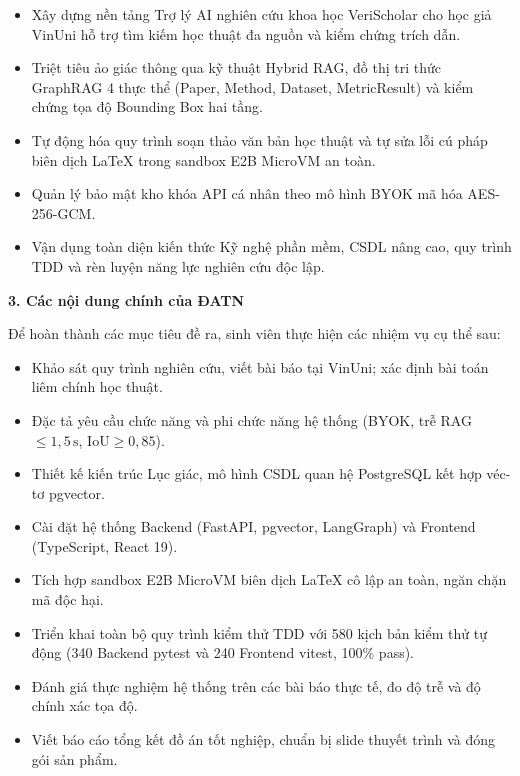 \begin{itemize}[leftmargin=*, itemsep=1.5pt, topsep=2pt, parsep=0pt, partopsep=0pt]
    \item[--] Xây dựng nền tảng Trợ lý AI nghiên cứu khoa học VeriScholar cho học giả VinUni hỗ trợ tìm kiếm học thuật đa nguồn và kiểm chứng trích dẫn.
    \item[--] Triệt tiêu ảo giác thông qua kỹ thuật Hybrid RAG, đồ thị tri thức GraphRAG 4 thực thể (Paper, Method, Dataset, MetricResult) và kiểm chứng tọa độ Bounding Box hai tầng.
    \item[--] Tự động hóa quy trình soạn thảo văn bản học thuật và tự sửa lỗi cú pháp biên dịch LaTeX trong sandbox E2B MicroVM an toàn.
    \item[--] Quản lý bảo mật kho khóa API cá nhân theo mô hình BYOK mã hóa AES-256-GCM.
    \item[--] Vận dụng toàn diện kiến thức Kỹ nghệ phần mềm, CSDL nâng cao, quy trình TDD và rèn luyện năng lực nghiên cứu độc lập.
\end{itemize}

\newpage
\thispagestyle{adminform}

\noindent \textbf{3. Các nội dung chính của ĐATN}
\vspace{0.04cm}

\noindent Để hoàn thành các mục tiêu đề ra, sinh viên thực hiện các nhiệm vụ cụ thể sau:
\begin{itemize}[leftmargin=*, noitemsep, topsep=1.5pt, parsep=0pt, partopsep=0pt]
    \item[--] Khảo sát quy trình nghiên cứu, viết bài báo tại VinUni; xác định bài toán liêm chính học thuật.
    \item[--] Đặc tả yêu cầu chức năng và phi chức năng hệ thống (BYOK, trễ RAG $\le 1{,}5\,\text{s}$, $\text{IoU} \ge 0{,}85$).
    \item[--] Thiết kế kiến trúc Lục giác, mô hình CSDL quan hệ PostgreSQL kết hợp véc-tơ pgvector.
    \item[--] Cài đặt hệ thống Backend (FastAPI, pgvector, LangGraph) và Frontend (TypeScript, React 19).
    \item[--] Tích hợp sandbox E2B MicroVM biên dịch LaTeX cô lập an toàn, ngăn chặn mã độc hại.
    \item[--] Triển khai toàn bộ quy trình kiểm thử TDD với 580 kịch bản kiểm thử tự động (340 Backend pytest và 240 Frontend vitest, 100\% pass).
    \item[--] Đánh giá thực nghiệm hệ thống trên các bài báo thực tế, đo độ trễ và độ chính xác tọa độ.
    \item[--] Viết báo cáo tổng kết đồ án tốt nghiệp, chuẩn bị slide thuyết trình và đóng gói sản phẩm.
\end{itemize}

